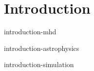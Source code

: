 \chapter{Introduction}

 {introduction-mhd}

 {introduction-astrophysics}

 {introduction-simulation}